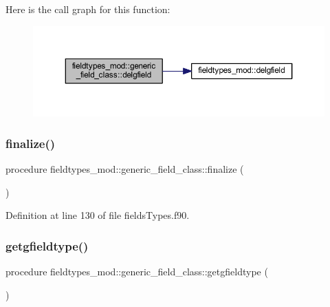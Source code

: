 Here is the call graph for this function\+:\nopagebreak
\begin{figure}[H]
\begin{center}
\leavevmode
\includegraphics[width=350pt]{structfieldtypes__mod_1_1generic__field__class_a14b5aa7f77712f703849552381484eed_cgraph}
\end{center}
\end{figure}
\mbox{\label{structfieldtypes__mod_1_1generic__field__class_ab787d81bd092318c61cb43fe0b255dca}} 
\subsubsection{\texorpdfstring{finalize()}{finalize()}}
{\footnotesize\ttfamily procedure fieldtypes\+\_\+mod\+::generic\+\_\+field\+\_\+class\+::finalize (\begin{DoxyParamCaption}{ }\end{DoxyParamCaption})\hspace{0.3cm}{\ttfamily [private]}}



Definition at line 130 of file fields\+Types.\+f90.

\mbox{\label{structfieldtypes__mod_1_1generic__field__class_a293a405922469cfc6e2fd61401a0bac7}} 
\subsubsection{\texorpdfstring{getgfieldtype()}{getgfieldtype()}}
{\footnotesize\ttfamily procedure fieldtypes\+\_\+mod\+::generic\+\_\+field\+\_\+class\+::getgfieldtype (\begin{DoxyParamCaption}{ }\end{DoxyParamCaption})\hspace{0.3cm}{\ttfamily [private]}}



